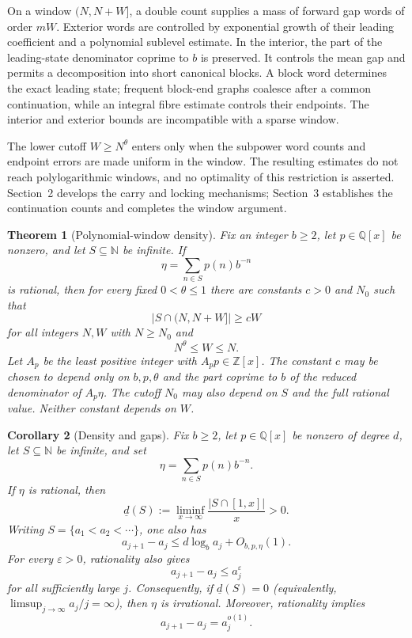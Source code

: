 \documentclass[10pt,a4paper]{amsart}
\newtheorem{theorem}{Theorem}[section]
\newtheorem{corollary}[theorem]{Corollary}
\newcommand{\N}{\mathbb N}
\newcommand{\Q}{\mathbb Q}
\newcommand{\Z}{\mathbb Z}
\begin{document}
On a window $(N,N+W]$, a double count supplies a mass of forward gap words of
order $mW$. Exterior words are controlled by exponential growth of their
leading coefficient and a polynomial sublevel estimate. In the interior,
the part of the leading-state denominator coprime to $b$ is preserved. It
controls the mean gap and permits a decomposition into short canonical
blocks. A block word determines the exact leading state; frequent block-end
graphs coalesce after a common continuation, while an integral fibre
estimate controls their endpoints. The interior and exterior bounds are
incompatible with a sparse window.

The lower cutoff $W\ge N^\theta$ enters only when the subpower word counts and
endpoint errors are made uniform in the window. The resulting estimates do
not reach polylogarithmic windows, and no optimality of this restriction is
asserted. Section~2 develops the carry and locking mechanisms; Section~3
establishes the continuation counts and completes the window argument.


\begin{theorem}[Polynomial-window density]\label{thm:main}
Fix an integer $b\ge2$, let $p\in\Q[x]$ be nonzero, and let
$S\subseteq\N$ be infinite.
If
\[
 \eta=\sum_{n\in S}p(n)b^{-n}
\]
is rational, then for every fixed $0<\theta\le1$ there are constants $c>0$
and $N_0$ such that
\[
 |S\cap(N,N+W]|\ge cW
\]
for all integers $N,W$ with $N\ge N_0$ and
\[
 N^\theta\le W\le N.
\]
Let $A_p$ be the least positive integer with $A_p p\in\Z[x]$. The constant
$c$ may be chosen to depend only on $b,p,\theta$ and the part coprime to $b$
of the reduced
denominator of $A_p\eta$. The cutoff $N_0$ may also depend on $S$ and the full
rational value. Neither constant depends on $W$.
\end{theorem}


\begin{corollary}[Density and gaps]\label{cor:erdos}
Fix $b\ge2$, let $p\in\Q[x]$ be nonzero of degree $d$, let
$S\subseteq\N$ be infinite, and set
\[
 \eta=\sum_{n\in S}p(n)b^{-n}.
\]
If $\eta$ is rational, then
\[
 \underline d(S):=\liminf_{x\to\infty}\frac{|S\cap[1,x]|}{x}>0.
\]
Writing $S=\{a_1<a_2<\cdots\}$, one also has
\[
 a_{j+1}-a_j\le d\log_ba_j+O_{b,p,\eta}(1).
\]
For every $\varepsilon>0$, rationality also gives
\[
 a_{j+1}-a_j\le a_j^\varepsilon
\]
for all sufficiently large $j$. Consequently, if
$\underline d(S)=0$ (equivalently,
$\limsup_{j\to\infty}a_j/j=\infty$), then $\eta$ is irrational.
Moreover, rationality implies
\[
 a_{j+1}-a_j=a_j^{o(1)}.
\]
\end{corollary}
\end{document}
